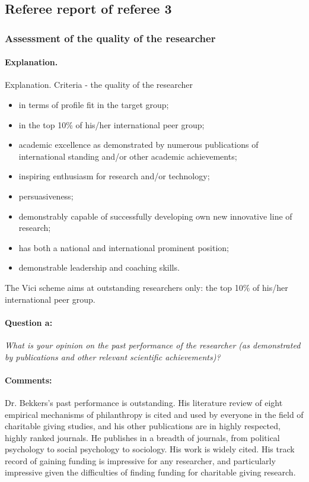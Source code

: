 \documentclass[twocolumn, serif, rga, numeric]{jote-article}
\begin{document}
 {}\subsection*{Referee report of referee 3} 
 {}\subsubsection*{Assessment of the quality of the researcher} 
\paragraph{Explanation.} Explanation. Criteria - the quality of the researcher

\begin{itemize}
    \item in terms of profile fit in the target group;
 \item in the top 10\% of his/her international peer group;
 \item academic excellence as demonstrated by numerous publications of international standing and/or other academic achievements;
 \item inspiring enthusiasm for research and/or technology;
 \item persuasiveness;
 \item demonstrably capable of successfully developing own new innovative line of research;
 \item has both a national and international prominent position;
 \item demonstrable leadership and coaching skills.
    \end{itemize}

 The Vici scheme aims at outstanding researchers only: the top 10\% of his/her international peer group.
\paragraph{Question a:}
\textit{What is your opinion on the past performance of the researcher (as demonstrated by publications and other relevant scientific achievements)?}
\paragraph{Comments:}
Dr. Bekkers's past performance is outstanding. His literature review of eight empirical mechanisms of philanthropy is cited and used by everyone in the field of charitable giving studies, and his other publications are in highly respected, highly ranked journals. He publishes in a breadth of journals, from political psychology to social psychology to sociology. His work is widely cited. His track record of gaining funding is impressive for any researcher, and particularly impressive given the difficulties of finding funding for charitable giving research.
\end{document}
